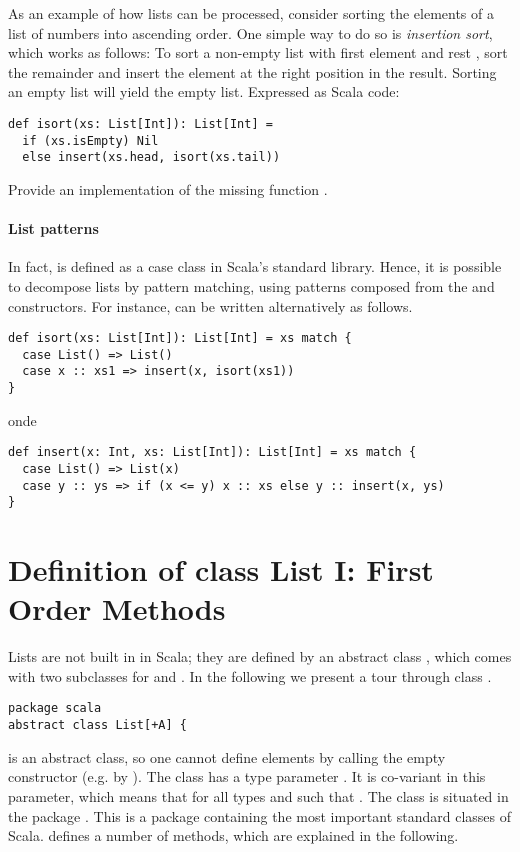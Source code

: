 As an example of how lists can be processed, consider sorting the
elements of a list of numbers into ascending order. One simple way to
do so is {\em insertion sort}, which works as follows: To sort a
non-empty list with first element  and rest , sort
the remainder  and insert the element  at the right
position in the result. Sorting an empty list will yield the
empty list. Expressed as Scala code:
\begin{lstlisting}
def isort(xs: List[Int]): List[Int] =
  if (xs.isEmpty) Nil
  else insert(xs.head, isort(xs.tail))
\end{lstlisting}

\begin{exercise} Provide an implementation of the missing function
.
\end{exercise}

\paragraph{List patterns} In fact, \code{::} is defined as a case
class in Scala's standard library. Hence, it is possible to decompose
lists by pattern matching, using patterns composed from the 
and \code{::} constructors. For instance,  can be written
alternatively as follows.
\begin{lstlisting}
def isort(xs: List[Int]): List[Int] = xs match {
  case List() => List()
  case x :: xs1 => insert(x, isort(xs1))
}
\end{lstlisting}
onde
\begin{lstlisting}
def insert(x: Int, xs: List[Int]): List[Int] = xs match {
  case List() => List(x)
  case y :: ys => if (x <= y) x :: xs else y :: insert(x, ys)
}
\end{lstlisting}

\section{Definition of class List I: First Order Methods}
\label{sec:list-first-order}

Lists are not built in in Scala; they are defined by an abstract class
, which comes with two subclasses for \code{::} and .
In the following we present a tour through class .
\begin{lstlisting}
package scala
abstract class List[+A] {
\end{lstlisting}
 is an abstract class, so one cannot define elements by
calling the empty  constructor (e.g. by
).  The class has a type parameter . It is
co-variant in this parameter, which means that
 for all types  and  such that
.  The class is situated in the package
. This is a package containing the most important standard
classes of Scala.
  defines a number of methods, which are
explained in the following.

